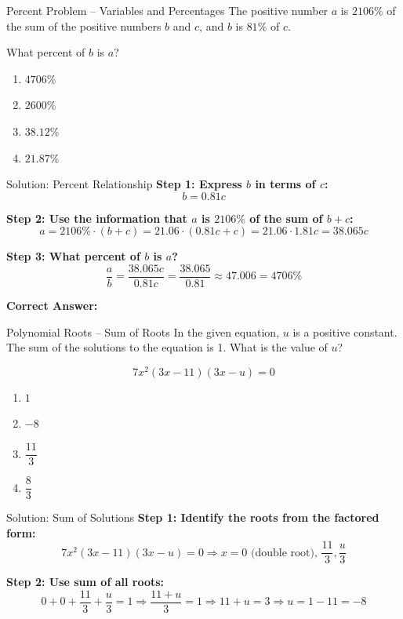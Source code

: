 \documentclass{beamer}
\begin{document}
\begin{frame}{Percent Problem – Variables and Percentages}
\small
The positive number $a$ is $2106\%$ of the sum of the positive numbers $b$ and $c$, and $b$ is $81\%$ of $c$.

What percent of $b$ is $a$?

\begin{enumerate}
    \item[A.] $4706\%$
    \item[B.] $2600\%$
    \item[C.] $38.12\%$
    \item[D.] $21.87\%$
\end{enumerate}
\end{frame}

\begin{frame}{Solution: Percent Relationship}
\small
\textbf{Step 1: Express $b$ in terms of $c$:}
\[
b = 0.81c
\]

\textbf{Step 2: Use the information that $a$ is $2106\%$ of the sum of $b + c$:}
\[
a = 2106\% \cdot (b + c) = 21.06 \cdot (0.81c + c) = 21.06 \cdot 1.81c = 38.065c
\]

\textbf{Step 3: What percent of $b$ is $a$?}
\[
\frac{a}{b} = \frac{38.065c}{0.81c} = \frac{38.065}{0.81} \approx 47.006 = 4706\%
\]

\textbf{Correct Answer:} 
\end{frame}



\begin{frame}{Polynomial Roots – Sum of Roots}
\small
In the given equation, $u$ is a positive constant. The sum of the solutions to the equation is 1. What is the value of $u$?

\[
7x^2(3x - 11)(3x - u) = 0
\]

\begin{enumerate}
    \item[A.] $1$
    \item[B.] $-8$
    \item[C.] $\dfrac{11}{3}$
    \item[D.] $\dfrac{8}{3}$
\end{enumerate}
\end{frame}

\begin{frame}{Solution: Sum of Solutions}
\small
\textbf{Step 1: Identify the roots from the factored form:}
\[
7x^2(3x - 11)(3x - u) = 0
\Rightarrow x = 0 \text{ (double root), } \frac{11}{3}, \frac{u}{3}
\]

\textbf{Step 2: Use sum of all roots:}
\[
0 + 0 + \frac{11}{3} + \frac{u}{3} = 1
\Rightarrow \frac{11 + u}{3} = 1
\Rightarrow 11 + u = 3
\Rightarrow u = 1 - 11 = -8
\]


\end{frame}
\end{document}
